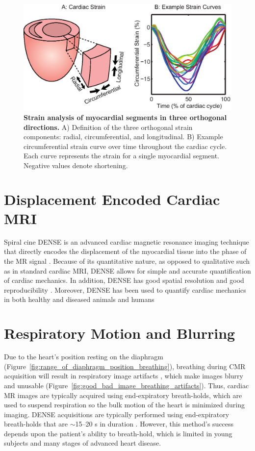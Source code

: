  	\begin{figure}
 		\centering
 		\includegraphics{figures/intro/3D_strain_explanation}
 		\caption[Strain analysis of myocardial segments in three orthogonal directions]{\textbf{Strain analysis of myocardial segments in three orthogonal directions.} A) Definition of the three orthogonal strain components: radial, circumferential, and longitudinal. B) Example circumferential strain curve over time throughout the cardiac cycle. Each curve represents the strain for a single myocardial segment. Negative values denote shortening.}
 		\label{fig:3D_strain_explanation}
 	\end{figure}

\section{Displacement Encoded Cardiac MRI}
	Spiral cine DENSE is an advanced cardiac magnetic resonance imaging technique that directly encodes the displacement of the myocardial tissue into the phase of the MR signal \cite{Aletras1999b}. Because of its quantitative nature, as opposed to qualitative such as in standard cardiac MRI, DENSE allows for simple and accurate quantification of cardiac mechanics. In addition, DENSE has good spatial resolution and good reproducibility \cite{Haggerty2013,Wehner2015a}. Moreover, DENSE has been used to quantify cardiac mechanics in both healthy and diseased animals and humans \cite{Aletras1999b,Aletras1999c,Kim2004,Ernande2012,Haggerty2013}

\section{Respiratory Motion and Blurring}
	Due to the heart's position resting on the diaphragm (Figure~\ref{fig:range_of_diaphragm_position_breathing}), breathing during CMR acquisition will result in respiratory image artifacts \cite{Axel1986}, which make images blurry and unusable (Figure~\ref{fig:good_bad_image_breathing_artifacts}). Thus, cardiac MR images are typically acquired using end-expiratory breath-holds, which are used to suspend respiration so the bulk motion of the heart is minimized during imaging. DENSE acquisitions are typically performed using end-expiratory breath-holds that are $\sim$15--20 s in duration \cite{Kim2004,Zhong2006a,Ernande2012,Zhong2010a,Aletras2005,Spottiswoode2007,Young2012c}. However, this method's success depends upon the patient's ability to breath-hold, which is limited in young subjects and many stages of advanced heart disease.
	
